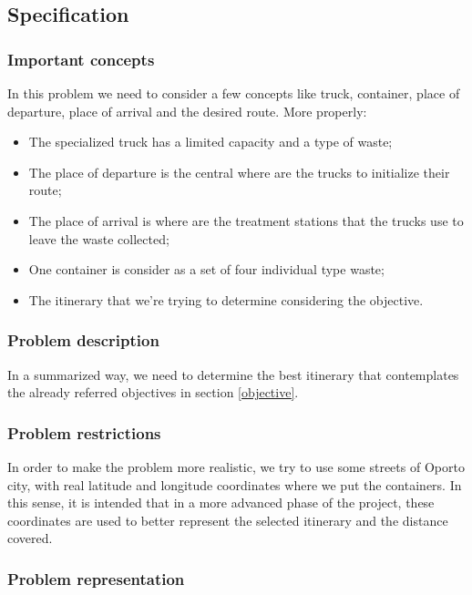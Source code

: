 \documentclass[a4paper]{article}
\begin{document}
\subsection{Specification}
\subsubsection{Important concepts}

In this problem we need to consider a few concepts like truck, container, place of departure, place of arrival and the desired route. More properly:

\begin{itemize}
	\item The specialized truck has a limited capacity and a type of waste;
	\item The place of departure is the central where are the trucks to initialize their route;
	\item The place of arrival is where are the treatment stations that the trucks use to leave the waste collected;
	\item One container is consider as a set of four individual type waste;
	\item The itinerary that we're trying to determine considering the objective. 
\end{itemize}

\subsubsection{Problem description}

In a summarized way, we need to determine the best itinerary that contemplates the already referred objectives in section \ref{objective}.

\subsubsection{Problem restrictions}

In order to make the problem more realistic, we try to use some streets of Oporto city, with real latitude and longitude coordinates where we put the containers. In this sense, it is intended that in a more advanced phase of the project, these coordinates are used to better represent the selected itinerary and the distance covered. 

\subsubsection{Problem representation}
\end{document}
